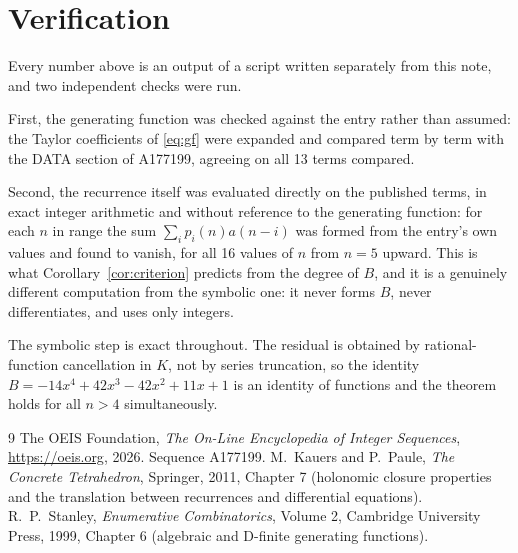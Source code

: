 \documentclass[11pt,a4paper]{article}
\theoremstyle{plain}
\theoremstyle{definition}
\begin{document}
\section{Verification}

Every number above is an output of a script written separately from this note, and two
independent checks were run.

First, the generating function was checked against the entry rather than assumed: the
Taylor coefficients of \eqref{eq:gf} were expanded and compared term by term with the DATA
section of A177199, agreeing on all 13 terms compared.

Second, the recurrence itself was evaluated directly on the published terms, in exact
integer arithmetic and without reference to the generating function: for each $n$ in range
the sum $\sum_{i}p_{i}(n)a(n-i)$ was formed from the entry's own values and found to
vanish, for all 16 values of $n$ from $n=5$ upward. This is what
Corollary~\ref{cor:criterion} predicts from the degree of $B$, and it is a genuinely
different computation from the symbolic one: it never forms $B$, never differentiates, and
uses only integers.

The symbolic step is exact throughout. The residual is obtained by rational-function
cancellation in $K$, not by series truncation, so the identity $B=- 14 x^{4} + 42 x^{3} - 42 x^{2} + 11 x + 1$ is an
identity of functions and the theorem holds for all $n>4$ simultaneously.

\begin{thebibliography}{9}
 The OEIS Foundation, \emph{The On-Line Encyclopedia of Integer Sequences},
\url{https://oeis.org}, 2026. Sequence A177199.
 M.~Kauers and P.~Paule, \emph{The Concrete Tetrahedron}, Springer, 2011,
Chapter 7 (holonomic closure properties and the translation between recurrences and
differential equations).
 R.~P.~Stanley, \emph{Enumerative Combinatorics}, Volume 2, Cambridge
University Press, 1999, Chapter 6 (algebraic and D-finite generating functions).
\end{thebibliography}
\end{document}
